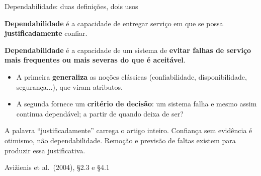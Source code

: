 \documentclass{beamer}
\newcommand{\sect}[1]{\par\smallskip\hfill{\tiny\color{black!55}Avi\v{z}ienis et al.\ (2004), #1}}
\begin{document}
\begin{frame}{Dependabilidade: duas defini\c{c}\~oes, dois usos}
    \footnotesize
    \begin{tcolorbox}[colback=depAzul!5,colframe=depAzul!70,boxrule=0.6pt,title={\scriptsize\bfseries Defini\c{c}\~ao original}]
        \scriptsize
        \textbf{Dependabilidade} \'e a capacidade de entregar servi\c{c}o em que se possa \textbf{justificadamente} confiar.
    \end{tcolorbox}
    \smallskip
    \begin{tcolorbox}[colback=depVerde!6,colframe=depVerde!60,boxrule=0.6pt,title={\scriptsize\bfseries Defini\c{c}\~ao alternativa}]
        \scriptsize
        \textbf{Dependabilidade} \'e a capacidade de um sistema de \textbf{evitar falhas de servi\c{c}o mais frequentes ou mais severas do que \'e aceit\'avel}.
    \end{tcolorbox}
    \medskip
    \begin{itemize}
        \item A primeira \textbf{generaliza} as no\c{c}\~oes cl\'assicas (confiabilidade, disponibilidade, seguran\c{c}a...), que viram atributos.
        \item A segunda fornece um \textbf{crit\'erio de decis\~ao}: um sistema falha e mesmo assim continua depend\'avel; a partir de quando deixa de ser?
    \end{itemize}
    \smallskip
    \begin{armadilha}
        \scriptsize
        A palavra ``justificadamente'' carrega o artigo inteiro. Confian\c{c}a sem evid\^encia \'e otimismo, n\~ao dependabilidade. Remo\c{c}\~ao e previs\~ao de faltas existem para produzir essa justificativa.
    \end{armadilha}
    \sect{\S2.3 e \S4.1}
\end{frame}
\end{document}
